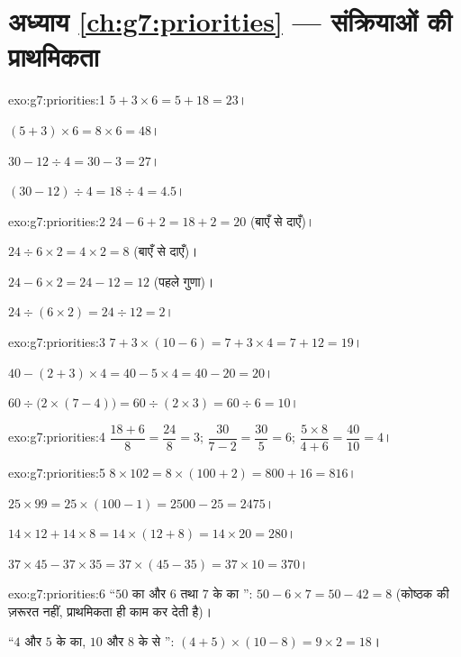 \section*{अध्याय \ref{ch:g7:priorities} --- संक्रियाओं की प्राथमिकता}

\begin{solution}{exo:g7:priorities:1}
$5 + 3 \times 6 = 5 + 18 = 23$।

$(5 + 3) \times 6 = 8 \times 6 = 48$।

$30 - 12 \div 4 = 30 - 3 = 27$।

$(30 - 12) \div 4 = 18 \div 4 = 4.5$।
\end{solution}

\begin{solution}{exo:g7:priorities:2}
$24 - 6 + 2 = 18 + 2 = 20$ (बाएँ से दाएँ)।

$24 \div 6 \times 2 = 4 \times 2 = 8$ (बाएँ से दाएँ)।

$24 - 6 \times 2 = 24 - 12 = 12$ (पहले गुणा)।

$24 \div (6 \times 2) = 24 \div 12 = 2$।
\end{solution}

\begin{solution}{exo:g7:priorities:3}
$7 + 3 \times (10 - 6) = 7 + 3 \times 4 = 7 + 12 = 19$।

$40 - (2 + 3) \times 4 = 40 - 5 \times 4 = 40 - 20 = 20$।

$60 \div \bigl(2 \times (7 - 4)\bigr) = 60 \div (2 \times 3)
= 60 \div 6 = 10$।
\end{solution}

\begin{solution}{exo:g7:priorities:4}
$\dfrac{18 + 6}{8} = \dfrac{24}{8} = 3$; \quad
$\dfrac{30}{7 - 2} = \dfrac{30}{5} = 6$; \quad
$\dfrac{5 \times 8}{4 + 6} = \dfrac{40}{10} = 4$।
\end{solution}

\begin{solution}{exo:g7:priorities:5}
$8 \times 102 = 8 \times (100 + 2) = 800 + 16 = 816$।

$25 \times 99 = 25 \times (100 - 1) = 2500 - 25 = 2475$।

$14 \times 12 + 14 \times 8 = 14 \times (12 + 8) = 14 \times 20 = 280$।

$37 \times 45 - 37 \times 35 = 37 \times (45 - 35) = 37 \times 10 =
370$।
\end{solution}

\begin{solution}{exo:g7:priorities:6}
``$50$ का और $6$ तथा $7$ के  का '':
$50 - 6 \times 7 = 50 - 42 = 8$ (कोष्ठक की ज़रूरत नहीं, प्राथमिकता
ही काम कर देती है)।

``$4$ और $5$ के  का, $10$ और $8$ के  से
'': $(4 + 5) \times (10 - 8) = 9 \times 2 = 18$।
\end{solution}

